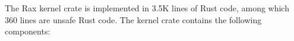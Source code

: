 The Rax kernel crate is implemented in 3.5K lines of Rust code, %
    among which 360 lines are unsafe Rust code.
The kernel crate contains the following components:
